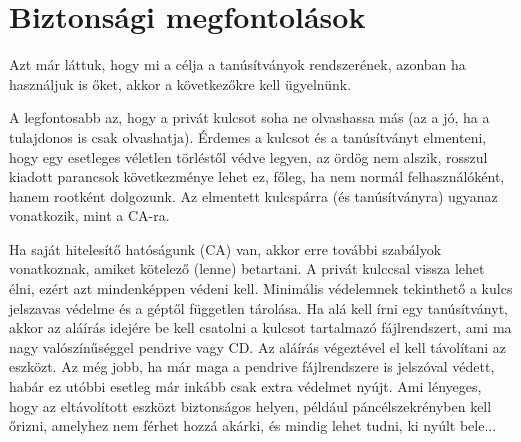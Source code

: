 \section{Biztonsági megfontolások}
Azt már láttuk, hogy mi a célja a tanúsítványok rendszerének, azonban ha használjuk is őket, akkor a következőkre kell
ügyelnünk.

A legfontosabb az, hogy a privát kulcsot soha ne olvashassa más (az a jó, ha a tulajdonos is csak olvashatja). Érdemes a
kulcsot és a tanúsítványt elmenteni, hogy egy esetleges véletlen törléstől védve legyen, az ördög nem alszik, rosszul
kiadott parancsok következménye lehet ez, főleg, ha nem normál felhasználóként, hanem rootként dolgozunk. Az elmentett
kulcspárra (és tanúsítványra) ugyanaz vonatkozik, mint a CA-ra.

Ha saját hitelesítő hatóságunk (CA) van, akkor erre további szabályok vonatkoznak, amiket kötelező (lenne) betartani. A
privát kulccsal vissza lehet élni, ezért azt mindenképpen védeni kell. Minimális védelemnek tekinthető a kulcs jelszavas
védelme és a géptől független tárolása. Ha alá kell írni egy tanúsítványt, akkor az aláírás idejére be kell csatolni a
kulcsot tartalmazó fájlrendszert, ami ma nagy valószínűséggel pendrive vagy CD. Az aláírás végeztével el kell távolítani
az eszközt. Az még jobb, ha már maga a pendrive fájlrendszere is jelszóval védett, habár ez utóbbi esetleg már inkább
csak extra védelmet nyújt. Ami lényeges, hogy az eltávolított eszközt biztonságos helyen, például páncélszekrényben kell
őrizni, amelyhez nem férhet hozzá akárki, és mindig lehet tudni, ki nyúlt bele...



